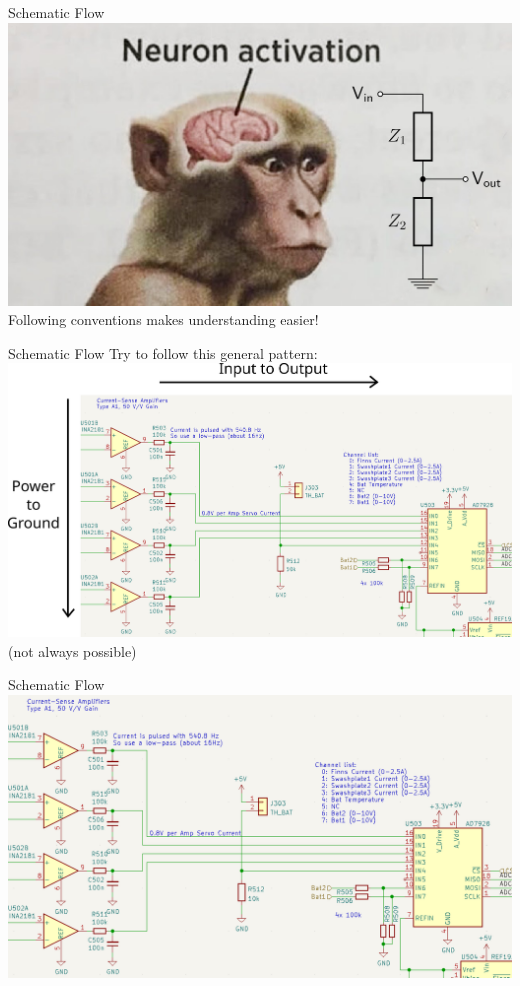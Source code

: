 \documentclass{beamer}
\begin{document}
\begin{frame}{Schematic Flow}
  \centering
  \includegraphics[width=\textwidth]{images/neuron-activation.png}
  \vspace{1cm}
  Following conventions makes understanding easier!
\end{frame}

\begin{frame}{Schematic Flow}
  Try to follow this general pattern:\\
  \vspace{0.2cm}
  \centering
  \includegraphics[width=\textwidth]{images/general-flow.png} 
  \pause
  (not always possible)
\end{frame}

\begin{frame}{Schematic Flow}
  \includegraphics[width=\textwidth]{images/ex1.png} 
\end{frame}
\end{document}
